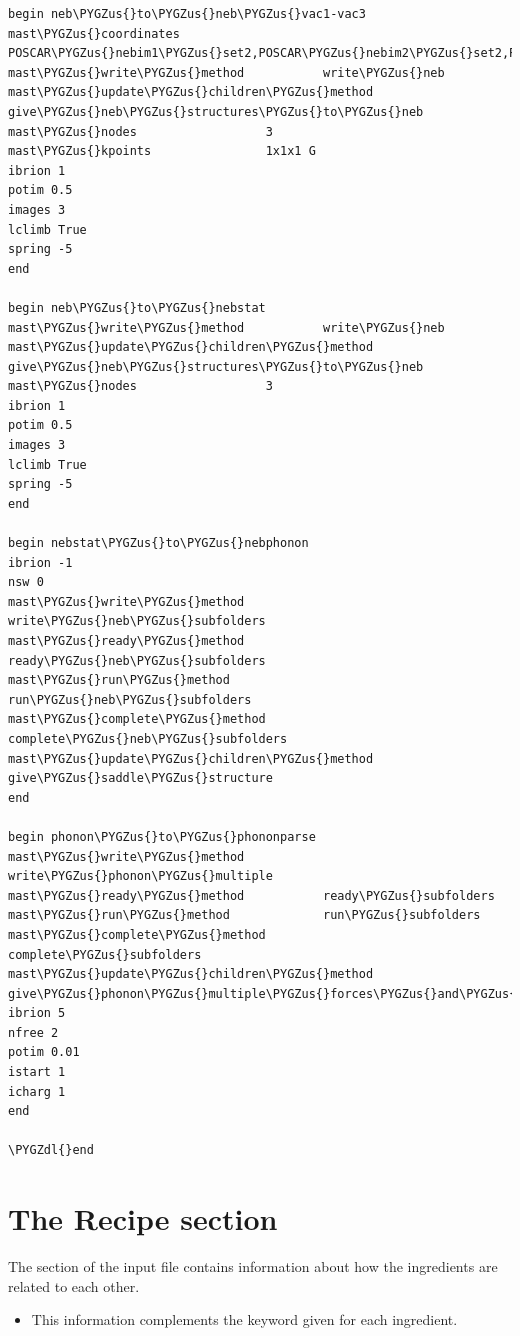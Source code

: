 \documentclass[letterpaper,10pt,english]{sphinxmanual}
\def\PYGZus{\char`\_}
\def\PYGZdl{\char`\$}
\begin{document}
\begin{Verbatim}[commandchars=\\\{\}]
begin neb\PYGZus{}to\PYGZus{}neb\PYGZus{}vac1-vac3
mast\PYGZus{}coordinates            POSCAR\PYGZus{}nebim1\PYGZus{}set2,POSCAR\PYGZus{}nebim2\PYGZus{}set2,POSCAR\PYGZus{}nebim3\PYGZus{}set2
mast\PYGZus{}write\PYGZus{}method           write\PYGZus{}neb
mast\PYGZus{}update\PYGZus{}children\PYGZus{}method  give\PYGZus{}neb\PYGZus{}structures\PYGZus{}to\PYGZus{}neb
mast\PYGZus{}nodes                  3
mast\PYGZus{}kpoints                1x1x1 G
ibrion 1
potim 0.5
images 3
lclimb True
spring -5
end

begin neb\PYGZus{}to\PYGZus{}nebstat
mast\PYGZus{}write\PYGZus{}method           write\PYGZus{}neb
mast\PYGZus{}update\PYGZus{}children\PYGZus{}method  give\PYGZus{}neb\PYGZus{}structures\PYGZus{}to\PYGZus{}neb
mast\PYGZus{}nodes                  3
ibrion 1
potim 0.5
images 3
lclimb True
spring -5
end

begin nebstat\PYGZus{}to\PYGZus{}nebphonon
ibrion -1
nsw 0
mast\PYGZus{}write\PYGZus{}method           write\PYGZus{}neb\PYGZus{}subfolders
mast\PYGZus{}ready\PYGZus{}method           ready\PYGZus{}neb\PYGZus{}subfolders
mast\PYGZus{}run\PYGZus{}method             run\PYGZus{}neb\PYGZus{}subfolders
mast\PYGZus{}complete\PYGZus{}method        complete\PYGZus{}neb\PYGZus{}subfolders
mast\PYGZus{}update\PYGZus{}children\PYGZus{}method  give\PYGZus{}saddle\PYGZus{}structure
end

begin phonon\PYGZus{}to\PYGZus{}phononparse
mast\PYGZus{}write\PYGZus{}method           write\PYGZus{}phonon\PYGZus{}multiple
mast\PYGZus{}ready\PYGZus{}method           ready\PYGZus{}subfolders
mast\PYGZus{}run\PYGZus{}method             run\PYGZus{}subfolders
mast\PYGZus{}complete\PYGZus{}method        complete\PYGZus{}subfolders
mast\PYGZus{}update\PYGZus{}children\PYGZus{}method  give\PYGZus{}phonon\PYGZus{}multiple\PYGZus{}forces\PYGZus{}and\PYGZus{}displacements
ibrion 5
nfree 2
potim 0.01
istart 1
icharg 1
end

\PYGZdl{}end
\end{Verbatim}


\section{The Recipe section}
\label{3_1_3_recipe:the-recipe-section}\label{3_1_3_recipe::doc}
The  section of the input file contains information about how the ingredients are related to each other.
\begin{itemize}
\item {} 
This information complements the  keyword given for each ingredient.

\end{itemize}
\end{document}
